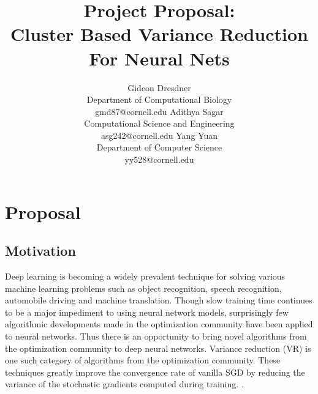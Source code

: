 \documentclass{article} %
\title{Project Proposal: \\Cluster Based Variance Reduction For Neural Nets}
\author{
Gideon Dresdner\\
Department of Computational Biology\\
gmd87@cornell.edu
\And
Adithya Sagar\\
Computational Science and Engineering\\
asg242@cornell.edu
\And
Yang Yuan  \\
Department of Computer Science\\
yy528@cornell.edu
}
\begin{document}
\maketitle


\section{Proposal}
\subsection{Motivation}
Deep learning is becoming a widely prevalent technique for solving various machine learning problems such as object recognition, speech recognition, automobile driving and machine translation. 
Though slow training time continues to be a major impediment to using neural network models,
surprisingly few algorithmic developments made in the optimization community have been applied to neural networks. Thus there is an opportunity to bring novel algorithms from the optimization community to deep neural networks.
Variance reduction (VR) is one such category of algorithms from the optimization community.
These techniques greatly improve the convergence rate of vanilla SGD by reducing the variance of the stochastic gradients computed during training. \cite{JohnsonZhang2013-SVRG,Shalev-Shwartz2013-SDCA,Schmidt2013-SAG,Shalev-ShwartzZhang2014-ProxSDCA,XiaoZhang2014-ProximalSVRG,Defazio2014-Finito,Defazio2014-SAGA,Mairal2015-MISO,UniVR, exploitingstructure}.
\end{document}
